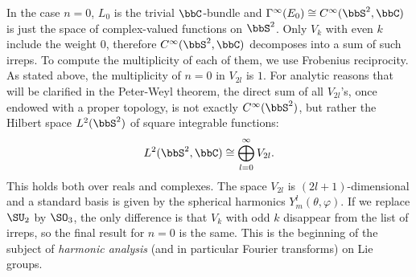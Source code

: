 \begin{example}
    In the case $n=0$, $L_0$ is the trivial $\bbC$-bundle and $\Gamma^\infty(E_0)\cong C^\infty(\bbS^2,\bbC)$ is just the space of complex-valued functions on $\bbS^2$. Only $V_k$ with even $k$ include the weight $0$, therefore $C^\infty(\bbS^2,\bbC)$ decomposes into a sum of such irreps. To compute the multiplicity of each of them, we use Frobenius reciprocity. As stated above, the multiplicity of $n=0$ in $V_{2l}$ is $1$. For analytic reasons that will be clarified in the Peter-Weyl theorem, the direct sum of all $V_{2l}$'s, once endowed with a proper topology, is not exactly $C^\infty(\bbS^2)$, but rather the Hilbert space $L^2(\bbS^2)$ of square integrable functions:
    \[L^2(\bbS^2,\bbC)\cong \bigoplus_{l=0}^\infty V_{2l}.\]
    This holds both over reals and complexes. The space $V_{2l}$ is $(2l+1)$-dimensional and a standard basis is given by the spherical harmonics $Y^l_m(\theta,\varphi)$. If we replace $\SU_2$ by $\SO_3$, the only difference is that $V_k$ with odd $k$ disappear from the list of irreps, so the final result for $n=0$ is the same. This is the beginning of the subject of \emph{harmonic analysis} (and in particular Fourier transforms) on Lie groups.
\end{example}








